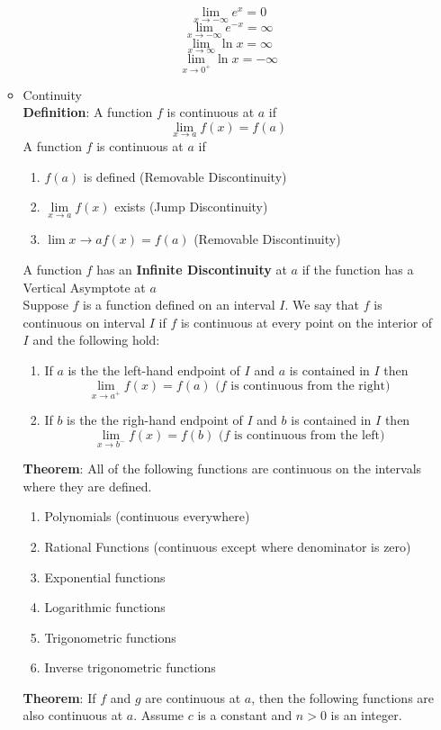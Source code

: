 \documentclass{article}
\begin{document}
\begin{itemize}
\begin{itemize}
		$$\lim_{x \to - \infty}{e^x} = 0$$
		$$\lim_{x \to - \infty}{e^{-x}} = \infty$$
		$$\lim_{x \to \infty}{\ln{x}} = \infty$$
		$$\lim_{x \to 0^+}{\ln{x}} = - \infty$$
		\item Continuity \\
		\textbf{Definition}: A function $f$ is continuous at $a$ if
		$$\lim_{x \to a}{f(x)} = f(a)$$
		A function $f$ is continuous at $a$ if
		\begin{enumerate}
			\item $f(a)$ is defined (Removable Discontinuity)
			\item $\lim\limits_{x \to a}{f(x)}$ exists (Jump Discontinuity)
			\item $\lim\limits{x \to a}{f(x)} = f(a)$ (Removable Discontinuity)
		\end{enumerate}
		A function $f$ has an \textbf{Infinite Discontinuity} at $a$ if the function has a Vertical Asymptote at $a$ \\
		Suppose $f$ is a function defined on an interval $I$. We say that $f$ is continuous on interval $I$ if $f$ is continuous at every point on the interior of $I$ and the following hold: \\
		\begin{enumerate}
			\item If $a$ is the the left-hand endpoint of $I$ and $a$ is contained in $I$ then
			$$\lim_{x \to a^+}{f(x)} = f(a) \text{ ($f$ is continuous from the right)}$$
			\item If $b$ is the the righ-hand endpoint of $I$ and $b$ is contained in $I$ then
			$$\lim_{x \to b^-}{f(x)} = f(b) \text{ ($f$ is continuous from the left)}$$
		\end{enumerate}
		\textbf{Theorem}: All of the following functions are continuous on the intervals where they are defined.
		\begin{enumerate}
			\item Polynomials (continuous everywhere)
			\item Rational Functions (continuous except where denominator is zero)
			\item Exponential functions
			\item Logarithmic functions
			\item Trigonometric functions
			\item Inverse trigonometric functions
		\end{enumerate}
		\textbf{Theorem}: If $f$ and $g$ are continuous at $a$, then the following functions are also continuous at $a$. Assume $c$ is a constant and $n > 0$ is an integer.

\end{itemize}
\end{itemize}
\end{document}
